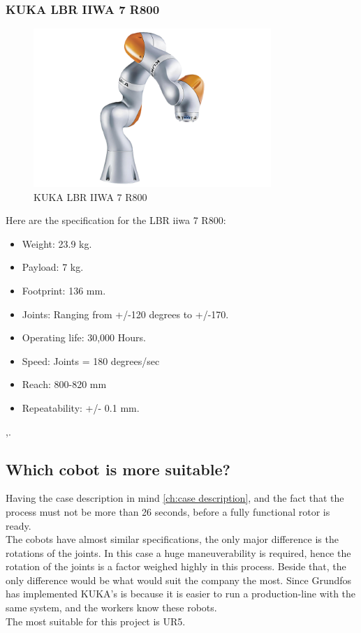 \subsubsection{KUKA LBR IIWA 7 R800}
\begin{figure}[h]
    \centering
    \includegraphics[width=9cm]{UR/1502895088_1.png}
    \caption{KUKA LBR IIWA 7 R800 \cite{KUKAbillede}}
    \label{fig:LBR IIWA}
\end{figure}

Here are the specification for the LBR iiwa 7 R800:\\

\begin{itemize}
    \item Weight: 23.9 kg.
    \item Payload: 7 kg.
    \item Footprint: 136 mm.
    \item Joints: Ranging from +/-120 degrees to +/-170.
    \item Operating life: 30,000 Hours.
    \item Speed: Joints = 180 degrees/sec
    \item Reach: 800-820 mm
    \item Repeatability: +/- 0.1 mm.
\end{itemize}
\cite{KukaSpec1},\cite{KukaSpec2}.

\subsection{Which cobot is more suitable?}

Having the case description in mind \ref{ch:case description}, and the fact that the process must not be more than 26 seconds, before a fully functional rotor is ready.\\
The cobots have almost similar specifications, the only major difference is the rotations of the joints. In this case a huge maneuverability is required, hence the rotation of the joints is a factor weighed highly in this process. Beside that, the only difference would be what would suit the company the most. Since Grundfos has implemented KUKA's is because it is easier to run a production-line with the same system, and the workers know these robots.\\
The most suitable for this project is UR5.

